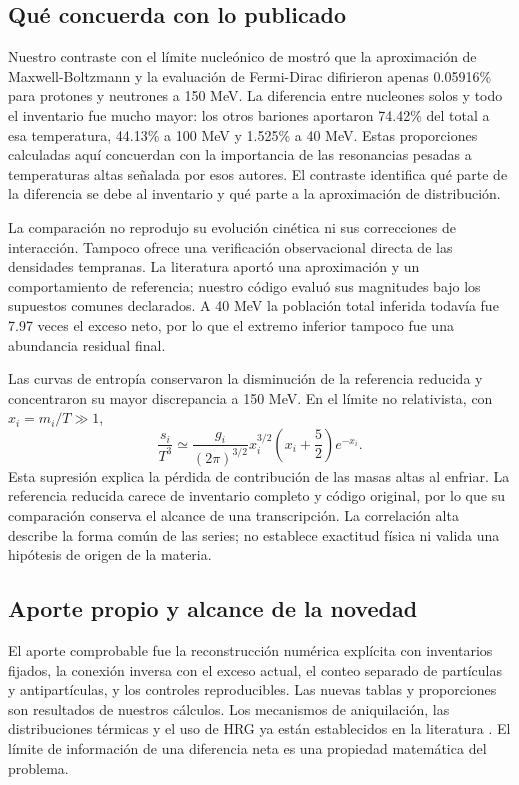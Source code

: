 \subsection{Qué concuerda con lo publicado}
Nuestro contraste con el límite nucleónico de \citet{Satarov2013} mostró que la aproximación de Maxwell-Boltzmann y la evaluación de Fermi-Dirac difirieron apenas 0.05916\% para protones y neutrones a 150 MeV. La diferencia entre nucleones solos y todo el inventario fue mucho mayor: los otros bariones aportaron 74.42\% del total a esa temperatura, 44.13\% a 100 MeV y 1.525\% a 40 MeV. Estas proporciones calculadas aquí concuerdan con la importancia de las resonancias pesadas a temperaturas altas señalada por esos autores. El contraste identifica qué parte de la diferencia se debe al inventario y qué parte a la aproximación de distribución.

La comparación no reprodujo su evolución cinética ni sus correcciones de interacción. Tampoco ofrece una verificación observacional directa de las densidades tempranas. La literatura aportó una aproximación y un comportamiento de referencia; nuestro código evaluó sus magnitudes bajo los supuestos comunes declarados. A 40 MeV la población total inferida todavía fue 7.97 veces el exceso neto, por lo que el extremo inferior tampoco fue una abundancia residual final.

Las curvas de entropía conservaron la disminución de la referencia reducida y concentraron su mayor discrepancia a 150 MeV. En el límite no relativista, con $x_i=m_i/T\gg1$,
\begin{equation}
\frac{s_i}{T^3}\simeq
\frac{g_i}{(2\pi)^{3/2}}x_i^{3/2}
\left(x_i+\frac{5}{2}\right)e^{-x_i}.
\label{eq:asymptotic}
\end{equation}
Esta supresión explica la pérdida de contribución de las masas altas al enfriar. La referencia reducida carece de inventario completo y código original, por lo que su comparación conserva el alcance de una transcripción. La correlación alta describe la forma común de las series; no establece exactitud física ni valida una hipótesis de origen de la materia.

\subsection{Aporte propio y alcance de la novedad}
El aporte comprobable fue la reconstrucción numérica explícita con inventarios fijados, la conexión inversa con el exceso actual, el conteo separado de partículas y antipartículas, y los controles reproducibles. Las nuevas tablas y proporciones son resultados de nuestros cálculos. Los mecanismos de aniquilación, las distribuciones térmicas y el uso de HRG ya están establecidos en la literatura \citep{Vovchenko2019,Satarov2013}. El límite de información de una diferencia neta es una propiedad matemática del problema.

